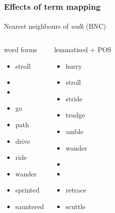 \documentclass[t]{beamer} %
\begin{document}
\begin{frame}
  \frametitle{Effects of term mapping}
  \framesubtitle{}

  \centering
  Nearest neighbours of \emph{walk} (BNC)
  \ungap\footnotesize
  \begin{columns}[t]
    \column{4cm}
    \begin{block}{word forms}
      \begin{itemize}
      \item stroll
      \item {}
      \item {}
      \item go
      \item path
      \item drive
      \item ride
      \item wander
      \item sprinted
      \item sauntered
      \end{itemize}
    \end{block}
    \column{4cm}
    \begin{block}{lemmatised + POS}
      \begin{itemize}
      \item hurry
      \item stroll
      \item stride
      \item trudge
      \item amble
      \item wander
      \item {} 
      \item {}
      \item retrace
      \item scuttle 
      \end{itemize}
    \end{block}
  \end{columns}

  \hfill{}
\end{frame}
\end{document}
